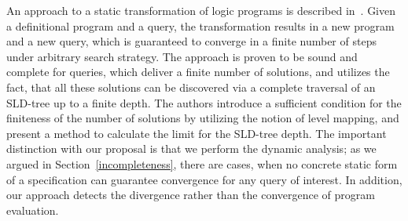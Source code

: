 An approach to a static transformation of logic programs is described in~\cite{BoundedNondeterminism}. Given a definitional program and
a query, the transformation results in a new program and a new query, which is guaranteed to converge in a finite number of steps
under arbitrary search strategy. The approach is proven to be sound and complete for queries, which deliver a finite number of solutions,
and utilizes the fact, that all these solutions can be discovered via a complete traversal of an SLD-tree up to a finite depth. The
authors introduce a sufficient condition for the finiteness of the number of solutions by utilizing the notion of level mapping, and
present a method to calculate the limit for the SLD-tree depth. The important distinction with our proposal is that we perform the
dynamic analysis; as we argued in Section~\ref{incompleteness}, there are cases, when no concrete static form of a specification can
guarantee convergence for any query of interest. In addition, our approach detects the divergence rather than the
convergence of program evaluation.
